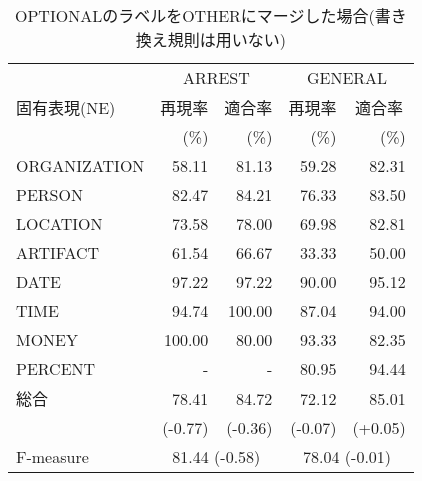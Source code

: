 {\scriptsize
\begin{table*}[htbp]
  \begin{center}
    \caption{OPTIONALのラベルをOTHERにマージした場合(書き換え規則は用いない)}
    \label{Comparison2} 
    \begin{tabular}{|l|r@{ }r|r@{ }r|}
      \hline
      & \multicolumn{2}{c|}{ARREST} 
      & \multicolumn{2}{c|}{GENERAL}\\
      \cline{2-5}
      固有表現(NE) & \multicolumn{1}{c}{再現率} 
      & \multicolumn{1}{c|}{適合率} & \multicolumn{1}{c}{再現率} 
      & \multicolumn{1}{c|}{適合率} \\
      & (\%) & (\%) & (\%) & (\%) \\
      \hline      
      ORGANIZATION &  58.11 &  81.13 & 59.28 & 82.31\\
      PERSON       &  82.47 &  84.21 & 76.33 & 83.50\\
      LOCATION     &  73.58 &  78.00 & 69.98 & 82.81\\
      ARTIFACT     &  61.54 &  66.67 & 33.33 & 50.00\\
      DATE         &  97.22 &  97.22 & 90.00 & 95.12\\
      TIME         &  94.74 & 100.00 & 87.04 & 94.00\\
      MONEY        & 100.00 &  80.00 & 93.33 & 82.35\\
      PERCENT      &      - &      - & 80.95 & 94.44\\
      \hline
      総合 & 78.41 & 84.72 & 72.12 & 85.01\\
      & (-0.77) & (-0.36) & (-0.07) & (+0.05) \\
      \hline
      \hline
      F-measure & \multicolumn{2}{c|}{81.44 (-0.58)} 
      & \multicolumn{2}{c|}{78.04 (-0.01)} \\
      \hline
    \end{tabular}
  \end{center}


\end{table*}}
